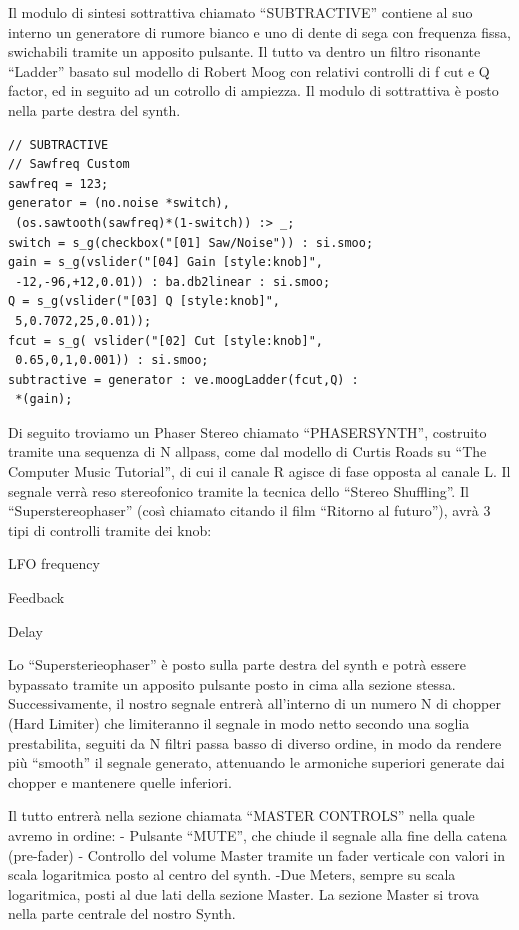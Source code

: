 \documentclass[
	a4paper,
	twocolumn
	]{article}
\begin{document}
Il modulo di sintesi sottrattiva chiamato “SUBTRACTIVE” contiene al suo interno un generatore di rumore bianco e uno di dente di sega con frequenza fissa, swichabili tramite un apposito pulsante. Il tutto va dentro un filtro risonante “Ladder” basato sul modello di Robert Moog con relativi controlli di f cut e Q factor, ed in seguito ad un cotrollo di ampiezza.
Il modulo di sottrattiva è posto nella parte destra del synth.


\begin{lstlisting}
// SUBTRACTIVE
// Sawfreq Custom
sawfreq = 123;
generator = (no.noise *switch),
 (os.sawtooth(sawfreq)*(1-switch)) :> _;
switch = s_g(checkbox("[01] Saw/Noise")) : si.smoo;
gain = s_g(vslider("[04] Gain [style:knob]",
 -12,-96,+12,0.01)) : ba.db2linear : si.smoo;
Q = s_g(vslider("[03] Q [style:knob]",
 5,0.7072,25,0.01));
fcut = s_g( vslider("[02] Cut [style:knob]",
 0.65,0,1,0.001)) : si.smoo;
subtractive = generator : ve.moogLadder(fcut,Q) :
 *(gain);
\end{lstlisting}


Di seguito troviamo un Phaser Stereo chiamato “PHASERSYNTH”, costruito tramite una sequenza di N allpass, come dal modello di Curtis Roads su “The Computer Music Tutorial”, di cui il canale R agisce di fase opposta al canale L. Il segnale verrà reso stereofonico tramite la tecnica dello “Stereo Shuffling”. Il “Superstereophaser” (così chiamato citando il film “Ritorno al futuro”), avrà 3 tipi di controlli tramite dei knob:
\begin{compactitem}
\item LFO frequency
\item Feedback
\item Delay
\end{compactitem}
Lo “Supersterieophaser” è posto sulla parte destra del synth e potrà essere bypassato tramite un apposito pulsante posto in cima alla sezione stessa.
Successivamente, il nostro segnale entrerà all’interno di un numero N di chopper (Hard Limiter) che limiteranno il segnale in modo netto secondo una soglia prestabilita, seguiti da N filtri passa basso di diverso ordine, in modo da rendere più “smooth” il segnale generato, attenuando le armoniche superiori generate dai chopper e mantenere quelle inferiori.

Il tutto entrerà nella sezione chiamata “MASTER CONTROLS” nella quale avremo in ordine:
- Pulsante “MUTE”, che chiude il segnale alla fine della catena (pre-fader)
- Controllo del volume Master tramite un fader verticale con valori in scala logaritmica posto al centro del synth.
-Due Meters, sempre su scala logaritmica, posti al due lati della sezione Master.
La sezione Master si trova nella parte centrale del nostro Synth.
\end{document}
